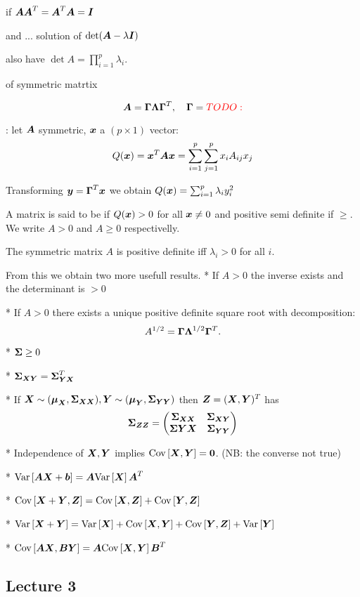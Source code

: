  if $\mA\mA^T=\mA^T\mA=\mI$

 and  ... solution of $\det(\mA-\lambda \mI)$

also have $\det{A} = \prod_{i=1}^p \lambda_i$.

 of symmetric matrtix

$$
    \mA=\mG\mL\mG^T, \quad \mG = \TODO{}
$$

: let $\mA$ symmetric, $\x$ a $(p\times 1)$ vector:
$$
    Q(\x) = \x^T \mA \x = \sum_{i=1}^p\sum_{j=1}^p x_i A_{ij} x_j
$$
\begin{theorem}
    Transforming $\y=\mG^T\x$ we obtain $Q(\x) = \sum_{i=1}^p \lambda_i y_i^2$
\end{theorem}
A matrix is said to be  if $Q(\x)>0$ for all $\x\ne0$ and positive semi definite if $\geq$. We write $A>0$ and $A\geq 0$ respectivelly. 
\begin{theorem}
    The symmetric matrix $A$ is positive definite iff $\lambda_i > 0$ for all $i$.
\end{theorem}
From this we obtain two more usefull results. 
* If $A>0$ the inverse exists and the determinant is $>0$

* If $A>0$ there exists a unique positive definite square root with decomposition:
$$
    A^{1/2} = \mG\mL^{1/2}\mG^T.
$$

* $\SS \geq 0$

* $\SS_{\X\Y} = \SS_{\Y\X}^T$

* If $\X\sim(\M_{\X}, \SS_{\X\X}), \Y\sim(\M_{\Y}, \SS_{\Y\Y})$ then $\Z=(\X,\Y)^T$ has
$$
    \SS_{\Z\Z} = \begin{pmatrix}
        \SS_{\X\X} & \SS_{\X\Y} \\ \SS{\Y\X} & \SS_{\Y\Y}
    \end{pmatrix}
$$

* Independence of $\X,\Y$ implies $\cov{\X,\Y}=\zero$. (NB: the converse not true)

* $\var{\mA\X+\boldsymbol{b}} = \mA \var{\X}\mA^T$

* $\cov{\X+\Y, \Z} = \cov{\X, \Z} + \cov{\Y, \Z}$

* $\var{\X+\Y} = \var{\X} + \cov{\X, \Y} + \cov{\Y, \Z} + \var{\Y}$

* $\cov{\mA\X, \mB\Y} = \mA\cov{\X, \Y}\mB^T$


\subsection*{Lecture 3}


